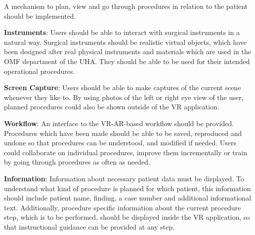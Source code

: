 \begin{compactenum}[label=(F \arabic*)]
\begin{compactenum}[label=(F 3.\arabic*)]
        \item \label{req::F3.7}A mechanism to plan, view and go through procedures in relation to the patient should be implemented.  
    \end{compactenum}
    \item \label{req::F4}\textbf{Instruments}: Users should be able to interact with surgical instruments in a natural way.
    Surgical instruments should be realistic virtual objects, which have been designed after real physical instruments and materials which are used in the OMF department of the UHA.
    They should be able to be used for their intended operational procedures.
    \item \label{req::F5}\textbf{Screen Capture}: Users should be able to make captures of the current scene whenever they like to.
    By using photos of the left or right eye view of the user, planned procedures could also be shown outside of the VR application. 
    \item \label{req::F6}\textbf{Workflow}: An interface to the VR-AR-based workflow should be provided.
    Procedures which have been made should be able to be saved, reproduced and undone so that procedures can be understood, and modified if needed.
    Users could collaborate on individual procedures, improve them incrementally or train by going through procedures as often as needed.
    \item \label{req::F7}\textbf{Information}: Information about necessary patient data must be displayed.
    To understand what kind of procedure is planned for which patient, this information should include patient name, finding, a case number and additional informational text.
    Additionally, procedure specific information about the current procedure step, which is to be performed, should be displayed inside the VR application, so that instructional guidance can 
    be provided at any step.
\end{compactenum}